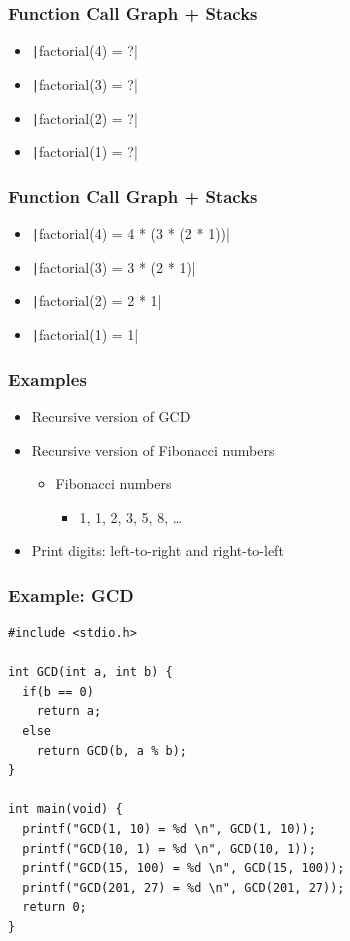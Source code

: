\documentclass{../c-lecture}
\begin{document}
\begin{frame}[fragile]
  \frametitle{Function Call Graph + Stacks}
  \begin{itemize}
    \item \texttt|factorial(4) = ?|
    \item \texttt|factorial(3) = ?|
    \item \texttt|factorial(2) = ?|
    \item \texttt|factorial(1) = ?|
  \end{itemize}
\end{frame}

\begin{frame}[fragile]
  \frametitle{Function Call Graph + Stacks}
  \begin{itemize}
    \item<1-> \texttt|factorial(4) = 4 * (3 * (2 * 1))|
    \item<2-> \texttt|factorial(3) = 3 * (2 * 1)|
    \item<3-> \texttt|factorial(2) = 2 * 1|
    \item<4-> \texttt|factorial(1) = 1|
  \end{itemize}
\end{frame}

\begin{frame}
  \frametitle{Examples}
  \begin{itemize}
    \item Recursive version of GCD
    \item Recursive version of Fibonacci numbers
    \begin{itemize}
      \item Fibonacci numbers
      \begin{itemize}
        \item 1, 1, 2, 3, 5, 8, \ldots
      \end{itemize}
    \end{itemize}
    \item Print digits: left-to-right and right-to-left
  \end{itemize}
\end{frame}

\begin{frame}[fragile]
  \frametitle{Example: GCD}
  \scriptsize
  \begin{verbatim}
#include <stdio.h>

int GCD(int a, int b) {
  if(b == 0)
    return a;
  else
    return GCD(b, a % b);
}

int main(void) {
  printf("GCD(1, 10) = %d \n", GCD(1, 10));
  printf("GCD(10, 1) = %d \n", GCD(10, 1));
  printf("GCD(15, 100) = %d \n", GCD(15, 100));
  printf("GCD(201, 27) = %d \n", GCD(201, 27));
  return 0;
}
  \end{verbatim}
\end{frame}
\end{document}
